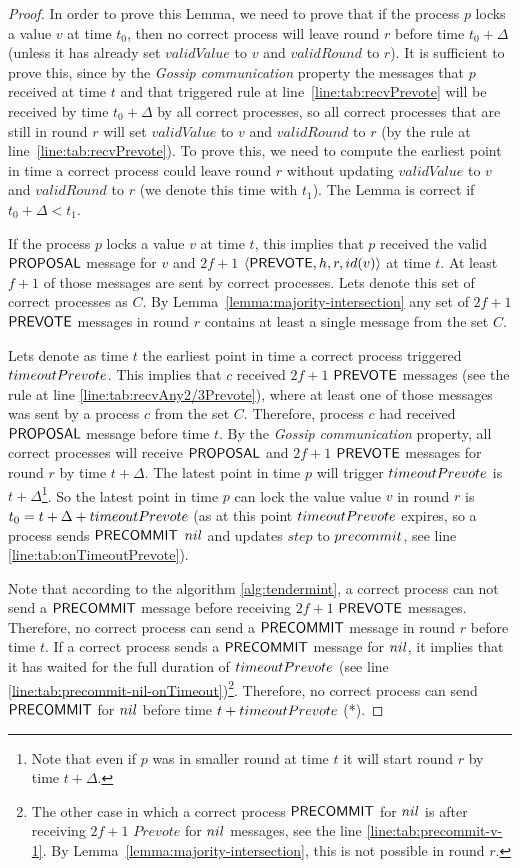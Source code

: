 \begin{proof} In order to prove this Lemma, we need to prove that if the
    process $p$ locks a value $v$ at time $t_0$, then no correct process will
    leave round $r$ before time $t_0 + \Delta$ (unless it has already set
    $validValue$ to $v$ and $validRound$ to $r$). It is sufficient to prove
    this, since by the \emph{Gossip communication} property the messages that
    $p$ received at time $t$ and that triggered rule at
    line~\ref{line:tab:recvPrevote} will be received by time $t_0 + \Delta$ by
    all correct processes, so all correct processes that are still in round $r$
    will set $validValue$ to $v$ and $validRound$ to $r$ (by the rule at
    line~\ref{line:tab:recvPrevote}). To prove this, we need to compute the
    earliest point in time a correct process could leave round $r$ without
    updating $validValue$ to $v$ and $validRound$ to $r$ (we denote this time
    with $t_1$). The Lemma is correct if $t_0 + \Delta < t_1$. 

If the process $p$ locks a value $v$ at time $t$, this implies that $p$
received the valid $\mathsf{PROPOSAL}$ message for $v$ and $2f+1$
$\langle\mathsf{PREVOTE},h,r,id(v)\rangle$ at time $t$. At least $f+1$ of those messages are
sent by correct processes. Lets denote this set of correct processes as $C$. By
Lemma~\ref{lemma:majority-intersection} any set of $2f+1$ $\mathsf{PREVOTE}$ messages
in round $r$ contains at least a single message from the set $C$. 

Lets denote as time $t$ the earliest point in time a correct process triggered
$timeoutPrevote$. This implies that $c$ received $2f+1$ $\mathsf{PREVOTE}$ messages
(see the rule at line \ref{line:tab:recvAny2/3Prevote}), where at least one of
those messages was sent by a process $c$ from the set $C$.  Therefore, process
$c$ had received $\mathsf{PROPOSAL}$ message before time $t$. By the \emph{Gossip
communication} property, all correct processes will receive $\mathsf{PROPOSAL}$ and
$2f+1$ $\mathsf{PREVOTE}$ messages for round $r$ by time $t+\Delta$. The latest point
in time $p$ will trigger $timeoutPrevote$ is $t+\Delta$\footnote{Note that
even if $p$ was in smaller round at time $t$ it will start round $r$ by time
$t+\Delta$.}.  So the latest point in time $p$ can lock the value value $v$ in
round $r$ is $t_0 = t+\Delta+timeoutPrevote$ (as at this point
$timeoutPrevote$ expires, so a process sends $\mathsf{PRECOMMIT}$ $nil$ and updates
$step$ to $precommit$, see line \ref{line:tab:onTimeoutPrevote}).  

Note that according to the algorithm \ref{alg:tendermint}, a correct process
can not send a $\mathsf{PRECOMMIT}$ message before receiving $2f+1$ $\mathsf{PREVOTE}$
messages.  Therefore, no correct process can send a $\mathsf{PRECOMMIT}$ message in
round $r$ before time $t$. If a correct process sends a $\mathsf{PRECOMMIT}$ message
for $nil$, it implies that it has waited for the full duration of
$timeoutPrevote$ (see line
\ref{line:tab:precommit-nil-onTimeout})\footnote{The other case in which a
correct process $\mathsf{PRECOMMIT}$ for $nil$ is after receiving $2f+1$ $Prevote$ for
$nil$ messages, see the line \ref{line:tab:precommit-v-1}. By
Lemma~\ref{lemma:majority-intersection}, this is not possible in round $r$.}.
Therefore, no correct process can send $\mathsf{PRECOMMIT}$ for $nil$ before time $t +
timeoutPrevote$ (*).


\end{proof}
